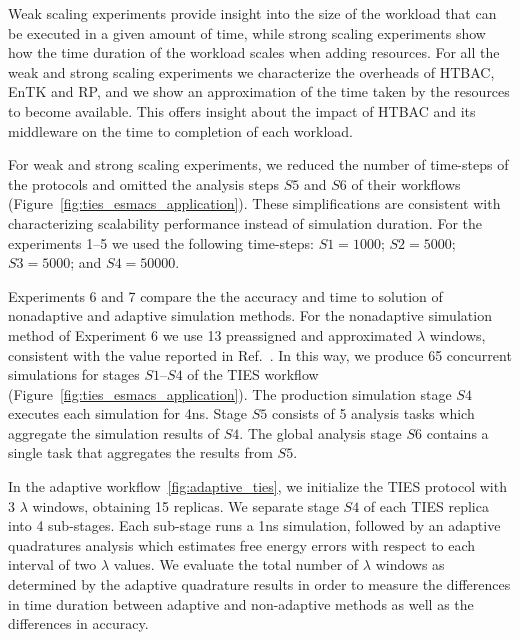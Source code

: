 Weak scaling experiments provide insight into the size of the workload that
can be executed in a given amount of time, while strong scaling experiments
show how the time duration of the workload scales when adding resources. For
all the weak and strong scaling experiments we characterize the overheads of
HTBAC, EnTK and RP, and we show an approximation of the time taken by the
resources to become available. This offers insight about the impact of HTBAC
and its middleware on the time to completion of each workload.

For weak and strong scaling experiments, we reduced the number of time-steps
of the protocols and omitted the analysis steps $S5$ and $S6$ of their
workflows (Figure~\ref{fig:ties_esmacs_application}). These simplifications
are consistent with characterizing scalability performance instead of
simulation duration. For the experiments 1--5 we used the following
time-steps: $S1=1000$; $S2=5000$; $S3=5000$; and $S4=50000$.

Experiments 6 and 7 compare the the accuracy and time to solution of
nonadaptive and adaptive simulation methods. For the nonadaptive simulation
method of Experiment 6 we use 13 preassigned and approximated $\lambda$
windows, consistent with the value reported in Ref.~\cite{Bhati2017}. In this
way, we produce 65 concurrent simulations for stages $S1$--$S4$ of the TIES
workflow (Figure~\ref{fig:ties_esmacs_application}). The production
simulation stage $S4$ executes each simulation for 4ns. Stage $S5$ consists
of 5 analysis tasks which aggregate the simulation results of $S4$. The
global analysis stage $S6$ contains a single task that aggregates the results
from $S5$.

In the adaptive workflow~\ref{fig:adaptive_ties}, we initialize the TIES
protocol with 3 $\lambda$ windows, obtaining 15 replicas. We separate stage
$S4$ of each TIES replica into 4 sub-stages. Each sub-stage runs a 1ns
simulation, followed by an adaptive quadratures analysis which estimates free
energy errors with respect to each interval of two $\lambda$ values. We
evaluate the total number of $\lambda$ windows as determined by the adaptive
quadrature results in order to measure the differences in time duration
between adaptive and non-adaptive methods as well as the differences in
accuracy.


